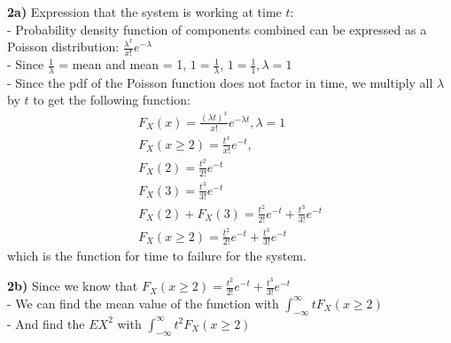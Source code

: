 \documentclass[oneside, a4paper]{article}
\begin{document}
\textbf{2a)} Expression that the system is working at time $t$:\\
- Probability density function of components combined can be expressed as a Poisson distribution: $\frac{\lambda ^x}{x!} e^{- \lambda}$ \\
- Since $\frac{1}{\lambda}$ = mean and mean = 1, $1 = \frac{1}{\lambda}$, $1 = \frac{1}{1}, \lambda = 1$ \\ 
- Since the pdf of the Poisson function does not factor in time, we multiply all $\lambda$ by $t$ to get the following function:
\begin{equation}
    \begin{split}
        F_X(x) = \frac{( \lambda t )^x}{x!} e^{- \lambda t}, \lambda = 1\\ 
        F_X(x \geq 2) = \frac{t^x}{x!} e^{-t}, \\
        F_X(2) = \frac{t^2}{2!} e^{-t} \\
        F_X(3) = \frac{t^3}{3!} e^{-t} \\
        F_X(2) + F_X(3) = \frac{t^2}{2!} e^{-t} + \frac{t^3}{3!} e^{-t} \\
        F_X(x \geq 2) = \frac{t^2}{2!} e^{-t} + \frac{t^3}{3!} e^{-t} 
    \end{split}
\end{equation}
which is the function for time to failure for the system.

\textbf{2b)} Since we know that $F_X(x \geq 2) = \frac{t^2}{2!} e^{-t} + \frac{t^3}{3!} e^{-t}$ \\
- We can find the mean value of the function with $\int _{-\infty}^{\infty} t F_X(x \geq 2)$ \\
- And find the $EX^2$ with $\int _{-\infty}^{\infty} t^2 F_X(x \geq 2)$ \\ 
\end{document}
